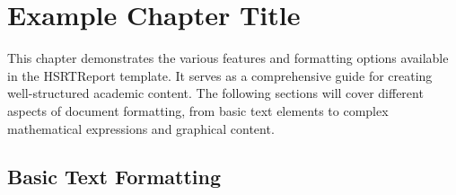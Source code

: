 
\chapter{Example Chapter Title}
\label{chap:example_chapter}


This chapter demonstrates the various features and formatting options available
in the HSRTReport template. It serves as a comprehensive guide for creating
well-structured academic content. The following sections will cover different
aspects of document formatting, from basic text elements to complex mathematical
expressions and graphical content.

\section{Basic Text Formatting}
\label{sec:basic_formatting}

